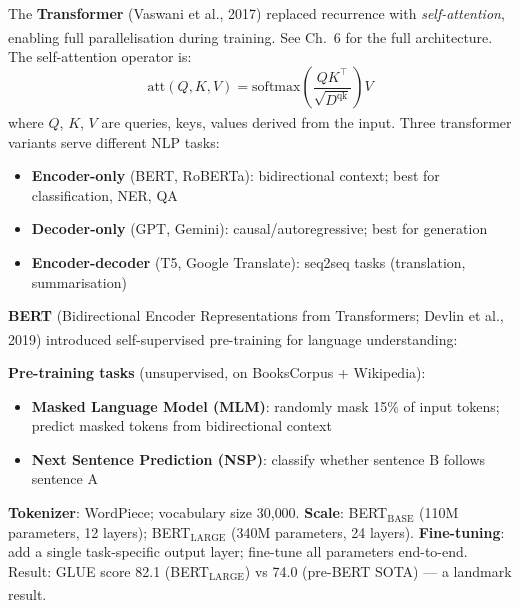 \begin{tcbitemize}[ skin=sectionraster ]
    \tcbitem[title={The Transformer for NLP}, raster multicolumn=3]
    The \textbf{Transformer} (Vaswani et al., 2017) replaced recurrence with \emph{self-attention}, enabling full parallelisation during training\textsuperscript{\cite[][]{vaswaniAttentionAllYou2023}}.
    See Ch.~6 for the full architecture. The self-attention operator is:
    \begin{equation}
        \mathrm{att}(Q, K, V) = \mathrm{softmax}\!\left(\frac{QK^\top}{\sqrt{D^{\mathrm{qk}}}}\right)\!V
    \end{equation}
    where $Q$, $K$, $V$ are queries, keys, values derived from the input\textsuperscript{\cite[][eq.~4.3]{fleuretLittleBookDeep}}.
    Three transformer variants serve different NLP tasks:
    \begin{itemize}
        \item \textbf{Encoder-only} (BERT, RoBERTa): bidirectional context; best for classification, NER, QA
        \item \textbf{Decoder-only} (GPT, Gemini): causal/autoregressive; best for generation
        \item \textbf{Encoder-decoder} (T5, Google Translate): seq2seq tasks (translation, summarisation)
    \end{itemize}

    \tcbitem[title={BERT: Pre-training for NLU}, raster multicolumn=3]
    \textbf{BERT} (Bidirectional Encoder Representations from Transformers; Devlin et al., 2019) introduced self-supervised pre-training for language understanding\textsuperscript{\cite[][pp.~1--4]{devlinBERTPretrainingDeep2019}}:

    \textbf{Pre-training tasks} (unsupervised, on BooksCorpus + Wikipedia):
    \begin{itemize}
        \item \textbf{Masked Language Model (MLM)}: randomly mask 15\% of input tokens; predict masked tokens from bidirectional context
        \item \textbf{Next Sentence Prediction (NSP)}: classify whether sentence B follows sentence A
    \end{itemize}
    \textbf{Tokenizer}: WordPiece; vocabulary size 30{,}000.
    \textbf{Scale}: BERT$_\mathrm{BASE}$ (110M parameters, 12 layers); BERT$_\mathrm{LARGE}$ (340M parameters, 24 layers).
    \textbf{Fine-tuning}: add a single task-specific output layer; fine-tune all parameters end-to-end.
    Result: GLUE score 82.1 (BERT$_\mathrm{LARGE}$) vs 74.0 (pre-BERT SOTA) --- a landmark result\textsuperscript{\cite[][p.~5]{devlinBERTPretrainingDeep2019}}.


\end{tcbitemize}
